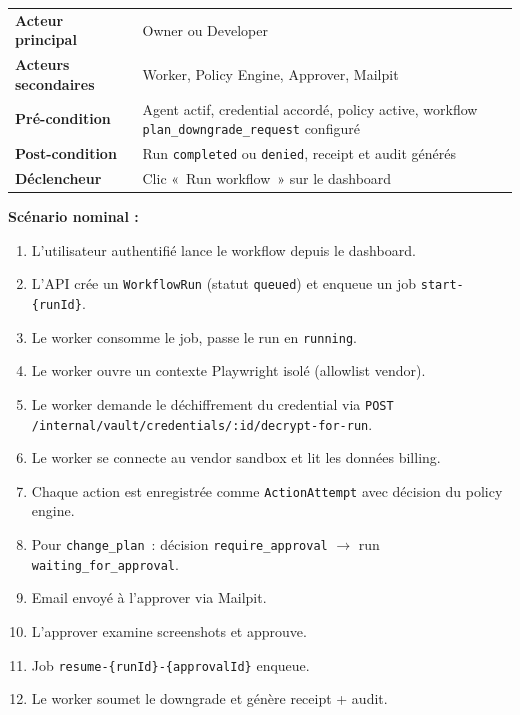 \begin{tcolorbox}[aegiscubox,
  title=Cas d'utilisation CU-WF-01 : Lancer un downgrade SaaS avec approbation]
\begin{tabularx}{\textwidth}{@{}p{3.2cm}X@{}}
\textbf{Acteur principal}    & Owner ou Developer \\
\textbf{Acteurs secondaires} & Worker, Policy Engine, Approver, Mailpit \\
\textbf{Pré-condition}       & Agent actif, credential accordé, policy active,
                               workflow \texttt{plan\_downgrade\_request} configuré \\
\textbf{Post-condition}      & Run \texttt{completed} ou \texttt{denied}, receipt
                               et audit générés \\
\textbf{Déclencheur}         & Clic «~Run workflow~» sur le dashboard \\
\end{tabularx}

\smallskip
\textbf{Scénario nominal :}
\begin{enumerate}[leftmargin=1.2cm, itemsep=2pt]
  \item L'utilisateur authentifié lance le workflow depuis le dashboard.
  \item L'API crée un \texttt{WorkflowRun} (statut \texttt{queued}) et
        enqueue un job \texttt{start-\{runId\}}.
  \item Le worker consomme le job, passe le run en \texttt{running}.
  \item Le worker ouvre un contexte Playwright isolé (allowlist vendor).
  \item Le worker demande le déchiffrement du credential via
        \texttt{POST /internal/vault/credentials/:id/decrypt-for-run}.
  \item Le worker se connecte au vendor sandbox et lit les données billing.
  \item Chaque action est enregistrée comme \texttt{ActionAttempt} avec
        décision du policy engine.
  \item Pour \texttt{change\_plan}~: décision \texttt{require\_approval}
        $\rightarrow$ run \texttt{waiting\_for\_approval}.
  \item Email envoyé à l'approver via Mailpit.
  \item L'approver examine screenshots et approuve.
  \item Job \texttt{resume-\{runId\}-\{approvalId\}} enqueue.
  \item Le worker soumet le downgrade et génère receipt + audit.
\end{enumerate}


\end{tcolorbox}
